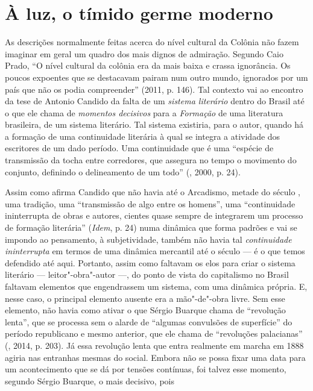 \section{À luz, o tímido germe moderno}

As descrições normalmente feitas acerca do nível cultural da Colônia não
fazem imaginar em geral um quadro dos mais dignos de admiração. Segundo
Caio Prado, ``O nível cultural da colônia era da mais baixa e crassa
ignorância. Os poucos expoentes que se destacavam pairam num outro
mundo, ignorados por um país que não os podia compreender'' (2011, p.
146). Tal contexto vai ao encontro da tese de Antonio Candido da falta
de um \emph{sistema literário} dentro do Brasil até o que ele chama de
\emph{momentos decisivos} para a \emph{Formação} de uma literatura
brasileira, de um sistema literário. Tal sistema existiria, para o
autor, quando há a formação de uma continuidade literária à qual se
integra a atividade dos escritores de um dado período. Uma continuidade
que é uma ``espécie de transmissão da tocha entre corredores, que
assegura no tempo o movimento do conjunto, definindo o delineamento de
um todo'' (, 2000, p. 24).

Assim como afirma Candido que não havia até o Arcadismo, metade do
século , uma tradição, uma ``transmissão de algo entre os homens'',
uma ``continuidade ininterrupta de obras e autores, cientes quase sempre
de integrarem um processo de formação literária'' (\emph{Idem}, p. 24)
numa dinâmica que forma padrões e vai se impondo ao pensamento, à
subjetividade, também não havia tal \emph{continuidade ininterrupta} em
termos de uma dinâmica mercantil até o século  --- é o que temos
defendido até aqui. Portanto, assim como faltavam os elos para criar o
sistema literário --- leitor"-obra"-autor ---, do ponto de vista do
capitalismo no Brasil faltavam elementos que engendrassem um sistema,
com uma dinâmica própria. E, nesse caso, o principal elemento ausente
era a mão"-de"-obra livre. Sem esse elemento, não havia como ativar o que
Sérgio Buarque chama de ``revolução lenta'', que se processa sem o
alarde de ``algumas convulsões de superfície'' do período republicano e
mesmo anterior, que ele chama de ``revoluções palacianas'' (,
2014, p. 203). Já essa revolução lenta que entra realmente em marcha em
1888 agiria nas entranhas mesmas do social. Embora não se possa fixar
uma data para um acontecimento que se dá por tensões contínuas, foi
talvez esse momento, segundo Sérgio Buarque, o mais decisivo, pois

